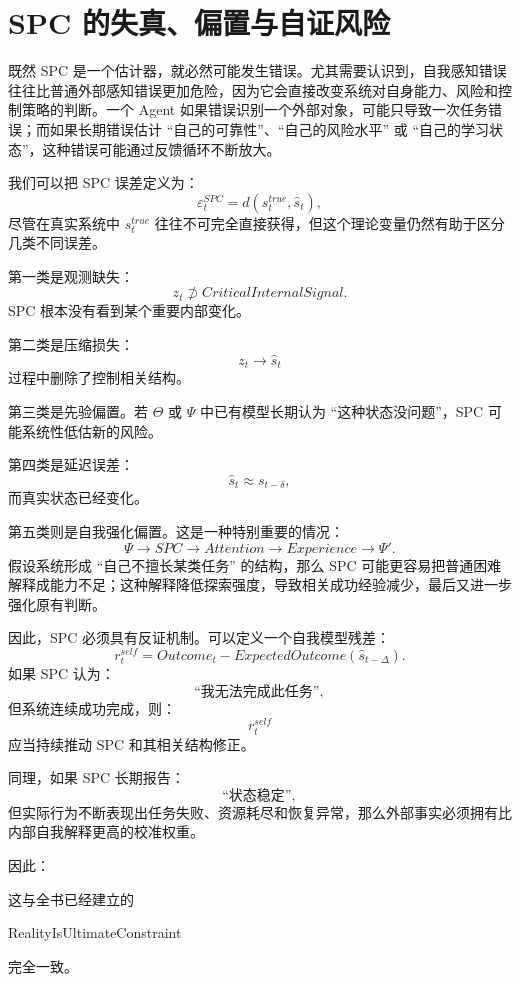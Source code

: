 \section{SPC 的失真、偏置与自证风险}

既然 SPC 是一个估计器，就必然可能发生错误。尤其需要认识到，自我感知错误往往比普通外部感知错误更加危险，因为它会直接改变系统对自身能力、风险和控制策略的判断。一个 Agent 如果错误识别一个外部对象，可能只导致一次任务错误；而如果长期错误估计 ``自己的可靠性''、``自己的风险水平'' 或 ``自己的学习状态''，这种错误可能通过反馈循环不断放大。

我们可以把 SPC 误差定义为：
\[
\varepsilon_t^{SPC}
=
d(
s_t^{true},
\hat{s}_t
),
\]
尽管在真实系统中 $s_t^{true}$ 往往不可完全直接获得，但这个理论变量仍然有助于区分几类不同误差。

第一类是观测缺失：
\[
z_t
\not\supset
CriticalInternalSignal.
\]
SPC 根本没有看到某个重要内部变化。

第二类是压缩损失：
\[
z_t
\rightarrow
\hat{s}_t
\]
过程中删除了控制相关结构。

第三类是先验偏置。若 $\Theta$ 或 $\Psi$ 中已有模型长期认为 ``这种状态没问题''，SPC 可能系统性低估新的风险。

第四类是延迟误差：
\[
\hat{s}_t
\approx
s_{t-\delta},
\]
而真实状态已经变化。

第五类则是自我强化偏置。这是一种特别重要的情况：
\[
\Psi
\rightarrow
SPC
\rightarrow
Attention
\rightarrow
Experience
\rightarrow
\Psi'.
\]
假设系统形成 ``自己不擅长某类任务'' 的结构，那么 SPC 可能更容易把普通困难解释成能力不足；这种解释降低探索强度，导致相关成功经验减少，最后又进一步强化原有判断。

因此，SPC 必须具有反证机制。可以定义一个自我模型残差：
\[
r_t^{self}
=
Outcome_t
-
ExpectedOutcome(
\hat{s}_{t-\Delta}
).
\]
如果 SPC 认为：
\[
\text{``我无法完成此任务''},
\]
但系统连续成功完成，则：
\[
r_t^{self}
\]
应当持续推动 SPC 和其相关结构修正。

同理，如果 SPC 长期报告：
\[
\text{``状态稳定''},
\]
但实际行为不断表现出任务失败、资源耗尽和恢复异常，那么外部事实必须拥有比内部自我解释更高的校准权重。

因此：
\begin{statementbox}
\centering
{}
\end{statementbox}
这与全书已经建立的
\begin{statementbox}
RealityIsUltimateConstraint
\end{statementbox}
完全一致。


